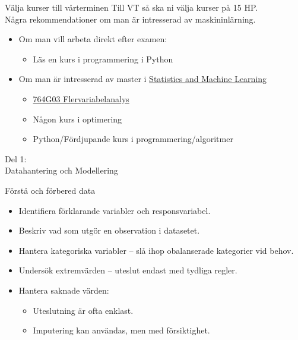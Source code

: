 \documentclass[10pt,english]{beamer}
\begin{document}
\begin{frame}{Välja kurser till vårterminen}
  Till VT så ska ni välja kurser på 15 HP. \\
  Några rekommendationer om man är intresserad av maskininlärning.
  \begin{itemize}
        \item Om man vill arbeta direkt efter examen: 
        \begin{itemize}
          \item Läs en kurs i programmering i Python
        \end{itemize}
        \item Om man är intresserad av master i \href{https://liu.se/en/education/program/f7mml}{Statistics and Machine Learning}
         \begin{itemize}
          \item \href{https://studieinfo.liu.se/kurs/764G03\#examination}{764G03 Flervariabelanalys}
          \item Någon kurs i optimering
          \item Python/Fördjupande kurs i programmering/algoritmer
        \end{itemize}
    \end{itemize}

\end{frame}


\begin{frame}[standout]
    \LARGE Del 1: \\ Datahantering och Modellering
\end{frame}



\begin{frame}{Förstå och förbered data}
\begin{itemize}
    \item Identifiera förklarande variabler och responsvariabel.
    \item Beskriv vad som utgör en observation i datasetet.
    \item Hantera kategoriska variabler – slå ihop obalanserade kategorier vid behov.
    \item Undersök extremvärden – uteslut endast med tydliga regler.
    \item Hantera saknade värden:
    \begin{itemize}
        \item Uteslutning är ofta enklast.
        \item Imputering kan användas, men med försiktighet.
    \end{itemize}
\end{itemize}
\end{frame}
\end{document}
